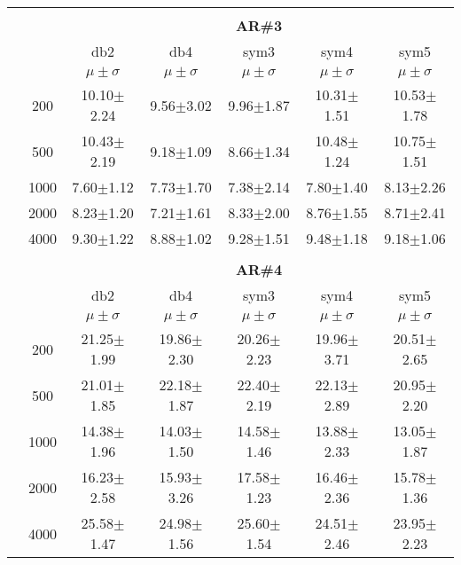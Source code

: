 \begin{table}[H]
\begin{tabular}{|c|c|c c c c c|}
	
	


\\ \midrule
\multicolumn{7}{c}{}\\ 



\cline{3-7}
\multicolumn{2}{c|}{\multirow{3}{*}{}} & \multicolumn{5}{c|}{\textbf{AR\#3}}   \\\cline{3-7} 

\multicolumn{2}{c|}{}  & db2 & db4 & sym3 & sym4 & sym5 \\\cline{3-7}
\multicolumn{2}{c|}{}& $\mu \pm \sigma$ & $\mu \pm \sigma$ & $\mu \pm \sigma$ & $\mu \pm \sigma$ & $\mu \pm \sigma$ \\\hline

\multicolumn{1}{|c|}{ \multirow{5}{*}{\rotatebox[origin=c]{90}{\textbf{Neurônios}}} }
&200	&10.10$\pm$2.24	&9.56$\pm$3.02	&9.96$\pm$1.87	&10.31$\pm$1.51	&10.53$\pm$1.78\\\cline{2-7}
&500	&10.43$\pm$2.19	&9.18$\pm$1.09	&8.66$\pm$1.34	&10.48$\pm$1.24	&10.75$\pm$1.51\\\cline{2-7}
&1000	&7.60$\pm$1.12	&7.73$\pm$1.70	&7.38$\pm$2.14	&7.80$\pm$1.40	&8.13$\pm$2.26\\\cline{2-7}
&2000	&8.23$\pm$1.20	&7.21$\pm$1.61	&8.33$\pm$2.00	&8.76$\pm$1.55	&8.71$\pm$2.41\\\cline{2-7}
&4000	&9.30$\pm$1.22	&8.88$\pm$1.02	&9.28$\pm$1.51	&9.48$\pm$1.18	&9.18$\pm$1.06




\\\midrule 
\multicolumn{7}{c}{}\\ 



\cline{3-7}
\multicolumn{2}{c|}{\multirow{3}{*}{}} & \multicolumn{5}{c|}{\textbf{AR\#4}}   \\\cline{3-7} 

\multicolumn{2}{c|}{}  & db2 & db4 & sym3 & sym4 & sym5 \\\cline{3-7}
\multicolumn{2}{c|}{}& $\mu \pm \sigma$ & $\mu \pm \sigma$ & $\mu \pm \sigma$ & $\mu \pm \sigma$ & $\mu \pm \sigma$ \\\hline

\multicolumn{1}{|c|}{ \multirow{5}{*}{\rotatebox[origin=c]{90}{\textbf{Neurônios}}} }
&200	&21.25$\pm$1.99	&19.86$\pm$2.30	&20.26$\pm$2.23	&19.96$\pm$3.71	&20.51$\pm$2.65\\\cline{2-7}
&500	&21.01$\pm$1.85	&22.18$\pm$1.87 &22.40$\pm$2.19	&22.13$\pm$2.89	&20.95$\pm$2.20\\\cline{2-7}
&1000	&14.38$\pm$1.96	&14.03$\pm$1.50	&14.58$\pm$1.46	&13.88$\pm$2.33	&13.05$\pm$1.87\\\cline{2-7}
&2000	&16.23$\pm$2.58	&15.93$\pm$3.26	&17.58$\pm$1.23	&16.46$\pm$2.36	&15.78$\pm$1.36\\\cline{2-7}
&4000	&25.58$\pm$1.47	&24.98$\pm$1.56	&25.60$\pm$1.54	&24.51$\pm$2.46	&23.95$\pm$2.23




\end{tabular}
\end{table}
